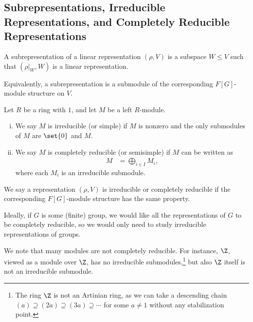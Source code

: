 \documentclass[10pt]{mypackage}
\begin{document}
\subsection{Subrepresentations, Irreducible Representations, and Completely Reducible Representations}%
\begin{definition}
  A subrepresentation of a linear representation $\left( \rho,V \right)$ is a subspace $W\leq V$ such that $\left( \rho|_{W},W \right)$ is a linear representation.

  Equivalently, a subrepresentation is a submodule of the corresponding $F[G]$-module structure on $V$.
\end{definition}
\begin{definition}
  Let $R$ be a ring with $1$, and let $M$ be a left $R$-module.
  \begin{enumerate}[(i)]
    \item We say $M$ is irreducible (or simple) if $M$ is nonzero and the only submodules of $M$ are $\set{0}$ and $M$.
    \item We say $M$ is completely reducible (or semisimple) if $M$ can be written as
      \begin{align*}
        M &= \bigoplus_{i\in I}M_i,
      \end{align*}
      where each $M_i$ is an irreducible submodule.
  \end{enumerate}
  We say a representation $\left( \rho,V \right)$ is irreducible or completely reducible if the corresponding $F[G]$-module structure has the same property.
\end{definition}
Ideally, if $G$ is some (finite) group, we would like all the representations of $G$ to be completely reducible, so we would only need to study irreducible representations of groups.

We note that many modules are not completely reducible. For instance, $\Z$, viewed as a module over $\Z$, has no irreducible submodules,\footnote{The ring $\Z$ is not an Artinian ring, as we can take a descending chain $\left( a \right)\supseteq \left( 2a \right)\supseteq \left( 3a \right)\supseteq\cdots$ for some $a \neq 1$ without any stabilization point.} but also $\Z$ itself is not an irreducible submodule.
\end{document}
